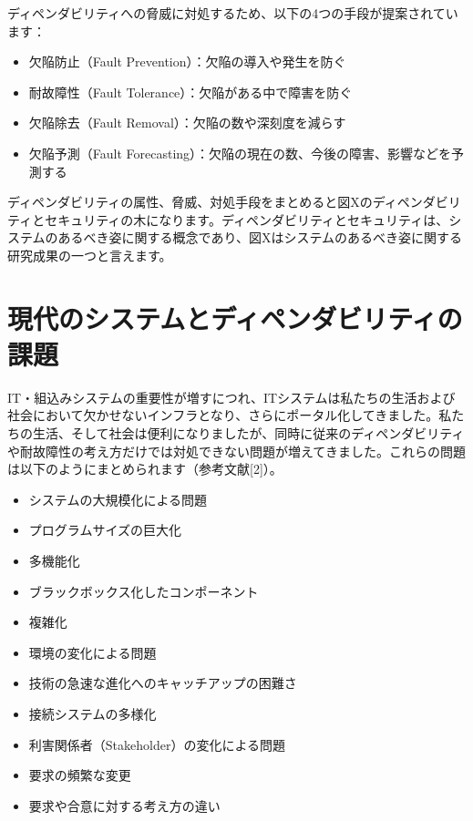 ディペンダビリティへの脅威に対処するため、以下の4つの手段が提案されています：
\begin{itemize}
\item 欠陥防止（Fault Prevention）：欠陥の導入や発生を防ぐ
\item 耐故障性（Fault Tolerance）：欠陥がある中で障害を防ぐ
\item 欠陥除去（Fault Removal）：欠陥の数や深刻度を減らす
\item 欠陥予測（Fault Forecasting）：欠陥の現在の数、今後の障害、影響などを予測する
\end{itemize}

ディペンダビリティの属性、脅威、対処手段をまとめると図Xのディペンダビリティとセキュリティの木になります。ディペンダビリティとセキュリティは、システムのあるべき姿に関する概念であり、図Xはシステムのあるべき姿に関する研究成果の一つと言えます。



\section{現代のシステムとディペンダビリティの課題}

IT・組込みシステムの重要性が増すにつれ、ITシステムは私たちの生活および社会において欠かせないインフラとなり、さらにポータル化してきました。私たちの生活、そして社会は便利になりましたが、同時に従来のディペンダビリティや耐故障性の考え方だけでは対処できない問題が増えてきました。これらの問題は以下のようにまとめられます（参考文献[2]）。
\begin{itemize}
\item システムの大規模化による問題
\item プログラムサイズの巨大化
\item 多機能化
\item ブラックボックス化したコンポーネント
\item 複雑化
\item 環境の変化による問題
\item 技術の急速な進化へのキャッチアップの困難さ
\item 接続システムの多様化
\item 利害関係者（Stakeholder）の変化による問題
\item 要求の頻繁な変更
\item 要求や合意に対する考え方の違い
\end{itemize}

